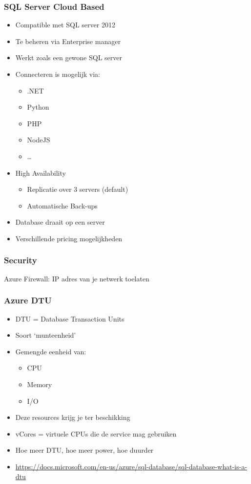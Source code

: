 \documentclass{article}
\begin{document}
\subsubsection{SQL Server Cloud Based}
\begin{itemize}
    \item Compatible met SQL server 2012
    \item Te beheren via Enterprise manager
    \item Werkt zoals een gewone SQL server
    \item Connecteren is mogelijk via:
    \begin{itemize}
        \item .NET
        \item Python
        \item PHP
        \item NodeJS
        \item \dots
    \end{itemize}
    \item High Availability
    \begin{itemize}
        \item Replicatie over 3 servers (default)
        \item Automatische Back-ups
    \end{itemize}
    \item Database draait op een server
    \item Verschillende pricing mogelijkheden
\end{itemize}

\subsubsection{Security}
Azure Firewall: IP adres van je netwerk toelaten

\subsubsection{Azure DTU}
\begin{itemize}
    \item DTU = Database Transaction Units
    \item Soort `munteenheid'
    \item Gemengde eenheid van:
    \begin{itemize}
        \item CPU
        \item Memory
        \item I/O
    \end{itemize}
    \item Deze resources krijg je ter beschikking
    \item vCores = virtuele CPUs die de service mag gebruiken
    \item Hoe meer DTU, hoe meer power, hoe duurder
    \item \url{https://docs.microsoft.com/en-us/azure/sql-database/sql-database-what-is-a-dtu}
\end{itemize}
\end{document}
